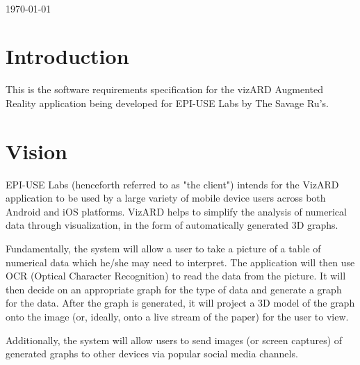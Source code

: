 \documentclass[a4paper,12pt]{article}
\begin{document}
\begin{titlepage}
\begin{minipage}{0.4\textwidth}
\begin{flushright}
\end{flushright}
\end{minipage}\\[4cm]



{\large \today}\\[3cm] %

 

\vfill %

\end{titlepage}

\newpage

\tableofcontents

\newpage

\section{Introduction}

This is the software requirements specification for the vizARD Augmented Reality application being developed for EPI-USE Labs by The Savage Ru's.

\newpage
\section{Vision}
EPI-USE Labs (henceforth referred to as "the client") intends for the VizARD application to be used by a large variety of mobile device users across both Android and iOS platforms. VizARD helps to simplify the analysis of numerical data through visualization, in the form of automatically generated 3D graphs.

Fundamentally, the system will allow a user to take a picture of a table of numerical data which he/she may need to interpret. The application will then use OCR (Optical Character Recognition) to read the data from the picture. It will then decide on an appropriate graph for the type of data and generate a graph for the data. After the graph is generated, it will project a 3D model of the graph onto the image (or, ideally, onto a live stream of the paper) for the user to view.

Additionally, the system will allow users to send images (or screen captures) of generated graphs to other devices via popular social media channels.
\end{document}
